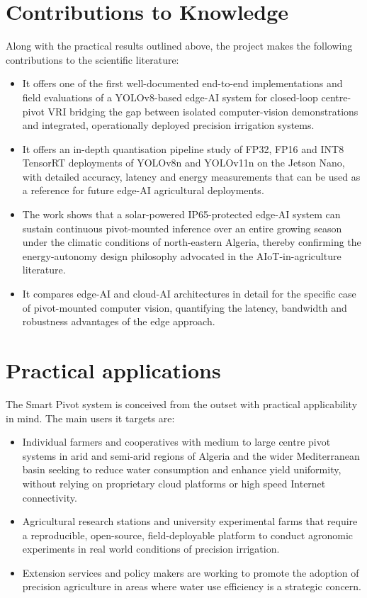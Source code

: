 \documentclass[12pt,a4paper]{report}
\begin{document}
\section{Contributions to Knowledge}

Along with the practical results outlined above, the project makes the following contributions to the scientific literature:

\begin{itemize}
    \item It offers one of the first well-documented end-to-end implementations and field evaluations of a YOLOv8-based edge-AI system for closed-loop centre-pivot VRI bridging the gap between isolated computer-vision demonstrations and integrated, operationally deployed precision irrigation systems.
    \item It offers an in-depth quantisation pipeline study of FP32, FP16 and INT8 TensorRT deployments of YOLOv8n and YOLOv11n on the Jetson Nano, with detailed accuracy, latency and energy measurements that can be used as a reference for future edge-AI agricultural deployments.
    \item The work shows that a solar-powered IP65-protected edge-AI system can sustain continuous pivot-mounted inference over an entire growing season under the climatic conditions of north-eastern Algeria, thereby confirming the energy-autonomy design philosophy advocated in the AIoT-in-agriculture literature.
    \item It compares edge-AI and cloud-AI architectures in detail for the specific case of pivot-mounted computer vision, quantifying the latency, bandwidth and robustness advantages of the edge approach.
\end{itemize}

\section{Practical applications}

The Smart Pivot system is conceived from the outset with practical applicability in mind. The main users it targets are:

\begin{itemize}
    \item Individual farmers and cooperatives with medium to large centre pivot systems in arid and semi-arid regions of Algeria and the wider Mediterranean basin seeking to reduce water consumption and enhance yield uniformity, without relying on proprietary cloud platforms or high speed Internet connectivity.
    \item Agricultural research stations and university experimental farms that require a reproducible, open-source, field-deployable platform to conduct agronomic experiments in real world conditions of precision irrigation.
    \item Extension services and policy makers are working to promote the adoption of precision agriculture in areas where water use efficiency is a strategic concern.
\end{itemize}
\end{document}

